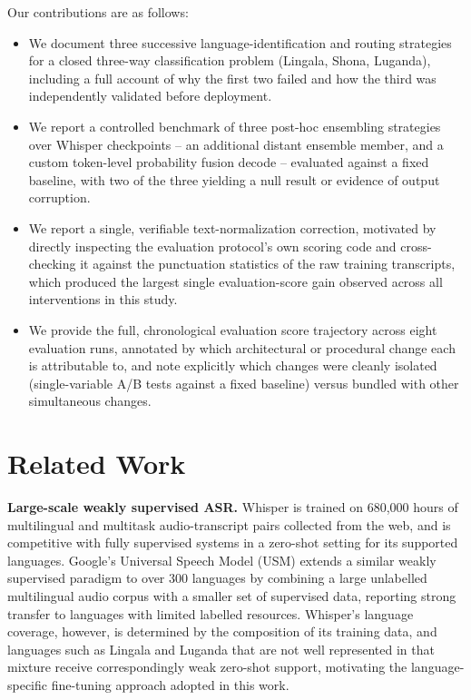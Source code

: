 \documentclass[11pt]{article}
\begin{document}
Our contributions are as follows:
\begin{itemize}
\item We document three successive language-identification and routing strategies for a closed three-way classification problem (Lingala, Shona, Luganda), including a full account of why the first two failed and how the third was independently validated before deployment.
\item We report a controlled benchmark of three post-hoc ensembling strategies over Whisper checkpoints -- an additional distant ensemble member, and a custom token-level probability fusion decode -- evaluated against a fixed baseline, with two of the three yielding a null result or evidence of output corruption.
\item We report a single, verifiable text-normalization correction, motivated by directly inspecting the evaluation protocol's own scoring code and cross-checking it against the punctuation statistics of the raw training transcripts, which produced the largest single evaluation-score gain observed across all interventions in this study.
\item We provide the full, chronological evaluation score trajectory across eight evaluation runs, annotated by which architectural or procedural change each is attributable to, and note explicitly which changes were cleanly isolated (single-variable A/B tests against a fixed baseline) versus bundled with other simultaneous changes.
\end{itemize}

\section{Related Work}

\textbf{Large-scale weakly supervised ASR.} Whisper \cite{radford2023whisper} is trained on 680{,}000 hours of multilingual and multitask audio-transcript pairs collected from the web, and is competitive with fully supervised systems in a zero-shot setting for its supported languages. Google's Universal Speech Model (USM) \cite{zhang2023usm} extends a similar weakly supervised paradigm to over 300 languages by combining a large unlabelled multilingual audio corpus with a smaller set of supervised data, reporting strong transfer to languages with limited labelled resources. Whisper's language coverage, however, is determined by the composition of its training data, and languages such as Lingala and Luganda that are not well represented in that mixture receive correspondingly weak zero-shot support, motivating the language-specific fine-tuning approach adopted in this work.
\end{document}
